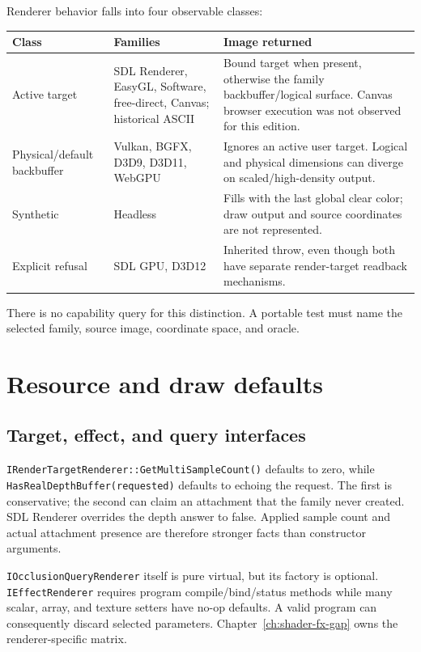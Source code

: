 Renderer behavior falls into four observable classes:

\begin{center}
\small
\begin{tabular}{@{}p{}p{}p{}@{}}
\toprule
\textbf{Class} & \textbf{Families} & \textbf{Image returned} \\
\midrule
Active target & SDL Renderer, EasyGL, Software, free-direct, Canvas; historical ASCII & Bound target when present, otherwise the family backbuffer/logical surface. Canvas browser execution was not observed for this edition. \\
Physical/default backbuffer & Vulkan, BGFX, D3D9, D3D11, WebGPU & Ignores an active user target. Logical and physical dimensions can diverge on scaled/high-density output. \\
Synthetic & Headless & Fills with the last global clear color; draw output and source coordinates are not represented. \\
Explicit refusal & SDL GPU, D3D12 & Inherited throw, even though both have separate render-target readback mechanisms. \\
\bottomrule
\end{tabular}
\end{center}

There is no capability query for this distinction. A portable test must name the selected
family, source image, coordinate space, and oracle.

\section{Resource and draw defaults}

\subsection{Target, effect, and query interfaces}

\texttt{IRenderTargetRenderer::GetMultiSampleCount()} defaults to zero, while
\texttt{HasRealDepthBuffer}\allowbreak\texttt{(requested)} defaults to echoing the request. The first is conservative;
the second can claim an attachment that the family never created. SDL Renderer overrides the
depth answer to false. Applied sample count and actual attachment presence are therefore stronger
facts than constructor arguments.

\texttt{IOcclusionQueryRenderer} itself is pure virtual, but its factory is optional.
\texttt{IEffectRenderer} requires program compile/bind/status methods while many scalar, array,
and texture setters have no-op defaults. A valid program can consequently discard selected
parameters. Chapter~\ref{ch:shader-fx-gap} owns the renderer-specific matrix.

